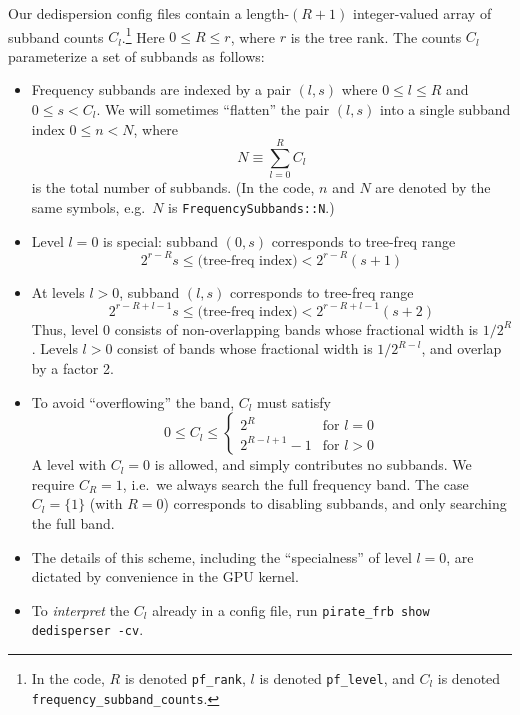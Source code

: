 \documentclass{article}
\numberwithin{equation}{section}   %
\begin{document}
Our dedispersion config files contain a length-$(R+1)$ integer-valued array of subband counts $C_l$.\footnote{In 
the code, $R$ is denoted {\tt pf\_rank}, $l$ is denoted {\tt pf\_level}, and $C_l$ is denoted {\tt frequency\_subband\_counts}.}
Here $0 \le R \le r$, where $r$ is the tree rank.
The counts $C_l$ parameterize a set of subbands as follows:
\begin{itemize}
\item Frequency subbands are indexed by a pair $(l,s)$ where $0 \le l \le R$ and $0 \le s < C_l$.
We will sometimes ``flatten'' the pair $(l,s)$ into a single subband index $0 \le n < N$, where
\begin{equation}
N \equiv \sum_{l=0}^R C_l
\end{equation}
is the total number of subbands. 
(In the code, $n$ and $N$ are denoted by the same symbols, e.g.\ $N$ is {\tt FrequencySubbands::N}.)
\item Level $l=0$ is special: subband $(0,s)$ corresponds to tree-freq range
\begin{equation}
2^{r-R} s \le \mbox{(tree-freq index)} < 2^{r-R} (s+1)  \label{eq:subband_l0}
\end{equation}
\item At levels $l>0$, subband $(l,s)$ corresponds to tree-freq range
\begin{equation}
2^{r-R+l-1} s \le \mbox{(tree-freq index)} < 2^{r-R+l-1} (s+2)  \label{eq:subband_l1}
\end{equation}
Thus, level 0 consists of non-overlapping bands whose fractional width is $1/2^R$.
Levels $l>0$ consist of bands whose fractional width is $1/2^{R-l}$, and overlap by a factor 2.
\item
To avoid ``overflowing'' the band, $C_l$ must satisfy
\begin{equation}
0 \le C_l \le \begin{cases}
2^R & \mbox{for } l=0 \\
2^{R-l+1}-1 & \mbox{for } l>0
\end{cases}
\label{eq:cl_max}
\end{equation}
A level with $C_l=0$ is allowed, and simply contributes no subbands.
We require $C_R=1$, i.e.~we always search the full frequency band.
The case $C_l=\{1\}$ (with $R=0$) corresponds to disabling subbands, and only searching the full band.
\item The details of this scheme, including the ``specialness'' of level $l=0$, are
dictated by convenience in the GPU kernel.
\item To {\em interpret} the $C_l$ already in a config file, run \verb|pirate_frb show dedisperser -cv|.

\end{itemize}
\end{document}
